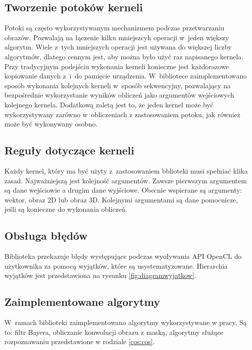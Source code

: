 \subsection{Tworzenie potoków kerneli}
\label{subsec:potokikerneli}

Potoki są często wykorzystywanym mechanizmem podczas przetwarzaniu obrazów. Pozwalają na łączenie kilku mniejszcyh operacji w~jeden większy algorytm. Wiele z~tych mniejszych operacji jest używana do większej liczby algorytmów, dlatego cennym jest, aby można było użyć raz napisanego kernela. Przy tradycyjnym podejściu wykonania kerneli konieczne jest każdorazowe kopiowanie danych z~i~do pamięcie urządzenia. W~bibliotece zaimplementowano sposób wykonania kolejnych kerneli w~sposób sekwencyjny, pozwalający na bezpośrednie wykorzystanie wyników obliczeń jako argumentów wejściowych kolejnego kernela. Dodatkową zaletą jest to, że jeden kernel może być wykorzystywany zarówno w~obliczeniach z zastosowaniem potoku, jak również może być wykonywany osobno.



\subsection{Reguły dotyczące kerneli}
\label{subsec:regulykerneli}

Każdy kernel, który ma być użyty z~zastosowaniem bblioteki musi spełniać klika zasad. Najważniejszą jest kolejność argumentów. Zawsze pierwszym argumentem są dane wejściowie a drugim dane wyjściowe. Obecnie wspierane są argumenty: wektor, obraz 2D lub obraz 3D. Kolejnymi argumentami są dane pomocnicze, jeśli są konieczne do wykonania obliczeń.

\subsection{Obsługa błędów}
\label{subsec:obslugabledow}

Biblioteka przekazuje błędy występujące podczas wyoływania API OpenCL do użytkownika za pomocą wyjątków, które są usystematyzowane. Hierarchia wyjątków jest przedstawiona na rysunku \ref{fig:diagramwyjatkow}.

\subsection{Zaimplementowane algorytmy}
\label{subsec:algorytmy}

W~ramach biblioteki zaimplementowano algorytmy wykorzystywane w pracy. Są to: filtr Bayera, obliczanie konwolucji obrazu z maską, algorytmy służące rozpoznawaniu przedstawione w rodziale \ref{cos:cos}.